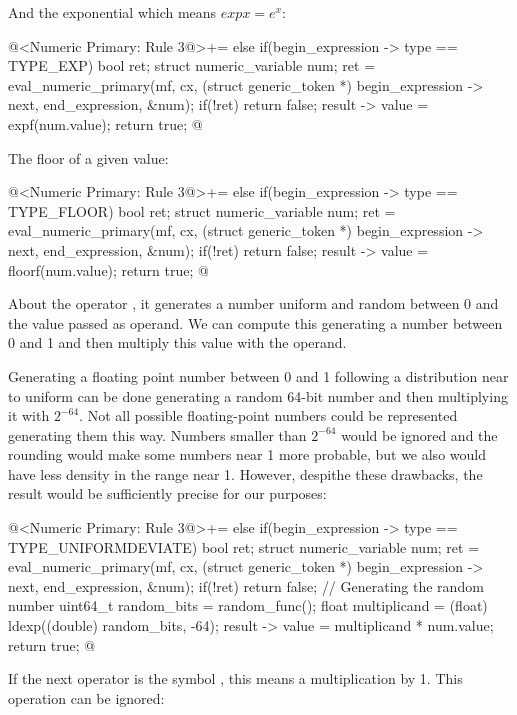 And the exponential which means $exp x = e^x$:

\iniciocodigo
@<Numeric Primary: Rule 3@>+=
else if(begin_expression -> type == TYPE_EXP){
  bool ret;
  struct numeric_variable num;
  ret = eval_numeric_primary(mf, cx, (struct generic_token *)
                             begin_expression -> next,
                             end_expression, &num);
  if(!ret)
    return false;
  result -> value = expf(num.value);
  return true;  
}
@
\fimcodigo

The floor of a given value:

\iniciocodigo
@<Numeric Primary: Rule 3@>+=
else if(begin_expression -> type == TYPE_FLOOR){
  bool ret;
  struct numeric_variable num;
  ret = eval_numeric_primary(mf, cx, (struct generic_token *)
                             begin_expression -> next,
                             end_expression, &num);
  if(!ret)
    return false;
  result -> value = floorf(num.value);
  return true;  
}
@
\fimcodigo

About the operator , it generates a number
uniform and random between 0 and the value passed as operand. We can
compute this generating a number between 0 and 1 and then multiply
this value with the operand.

Generating a floating point number between 0 and 1 following a
distribution near to uniform can be done generating a random 64-bit
number and then multiplying it with $2^{-64}$. Not all possible
floating-point numbers could be represented generating them this
way. Numbers smaller than $2^{-64}$ would be ignored and the rounding
would make some numbers near 1 more probable, but we also would have
less density in the range near 1. However, despithe these drawbacks,
the result would be sufficiently precise for our purposes:

\iniciocodigo
@<Numeric Primary: Rule 3@>+=
else if(begin_expression -> type == TYPE_UNIFORMDEVIATE){
  bool ret;
  struct numeric_variable num;
  ret = eval_numeric_primary(mf, cx, (struct generic_token *)
                             begin_expression -> next,
                             end_expression, &num);
  if(!ret)
    return false;
  { // Generating the random number
    uint64_t random_bits = random_func();
    float multiplicand = (float) ldexp((double) random_bits, -64);
    result -> value = multiplicand * num.value;  
  }
  return true;  
}
@
\fimcodigo

If the next operator is the symbol \monoespaco{+}, this means a
multiplication by 1. This operation can be ignored:

